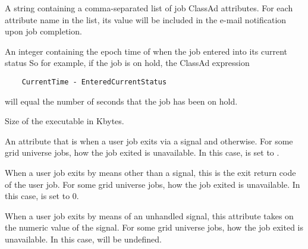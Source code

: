 \begin{description}
\item[\AdAttr{EmailAttributes}:]  A string containing a comma-separated
list of job ClassAd attributes. For each attribute name in the list,
its value will be included in the e-mail notification upon job completion.

\item[\AdAttr{EnteredCurrentStatus}:]  An integer containing the
epoch time of when the job entered into its current status
So for example, if the job is on hold, the ClassAd expression
\begin{verbatim}
    CurrentTime - EnteredCurrentStatus
\end{verbatim}
will equal the number of seconds that the job has been on hold.

\item[\AdAttr{ExecutableSize}:]  Size of the executable in Kbytes.

\item[\AdAttr{ExitBySignal}:]  An attribute that is 
when a user job exits via a signal and  otherwise.
For some grid universe jobs, how the job exited is
unavailable. In this case,  is set to  .

\item[\AdAttr{ExitCode}:]  When a user job exits by means other than a signal,
this is the exit return code of the user job.
For some grid universe jobs, how the job exited is
unavailable. In this case,  is set to  0.

\item[\AdAttr{ExitSignal}:]  When a user job exits by means of an unhandled 
signal, this attribute takes on the numeric value of the signal.
For some grid universe jobs, how the job exited is
unavailable. In this case,  will be undefined.


\end{description}
